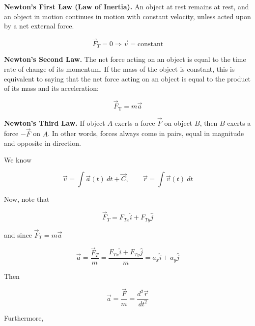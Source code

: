 \documentclass[12pt]{article}
\theoremstyle{definition}
\begin{document}
\begin{shaded}
    \textbf{Newton's First Law (Law of Inertia).} An object at rest remains at
    rest, and an object in motion continues in motion with constant velocity,
    unless acted upon by a net external force. 

    \begin{equation}
        \vec{F}_T = 0 \Rightarrow \vec{v} = \text{constant}
    \end{equation}

    \textbf{Newton's Second Law.} The net force acting on an object is equal to
    the time rate of change of its momentum. If the mass of the object is
    constant, this is equivalent to saying that the net force acting on an
    object is equal to the product of its mass and its acceleration:

    \begin{equation}
        \vec{F}_{\text{T}} = m \vec{a}
    \end{equation}

    \textbf{Newton's Third Law.} If object $A$ exerts a force $\vec{F}$ on
    object $B$, then $B$ exerts a force $-\vec{F}$ on $A$. In other words,
    forces always come in pairs, equal in magnitude and opposite in direction.
    
\end{shaded}

We know 

\begin{equation*}
    \vec{v} = \int \vec{a}(t) ~ dt + \vec{C}, \qquad \vec{r} = \int \vec{v}(t) ~
    dt
\end{equation*}

Now, note that 

\begin{equation*}
    \vec{F}_T = F_{Tx}\hat{i} + F_{Ty} \hat{j}
\end{equation*}

and since $\vec{F}_T = m \vec{a}$

\begin{equation*}
    \vec{a} = \frac{ \vec{F}_T }{m} =  \frac{F_{Tx}\hat{i} + F_{Ty} \hat{j}}{m}
    = a_x \hat{i} + a_y \hat{j}
\end{equation*}

Then 

\begin{equation}
    \vec{a} =  \frac{ \vec{F} }{m} = \frac{d^2 \vec{r}}{dt^2}
\end{equation}

Furthermore, 
\end{document}
